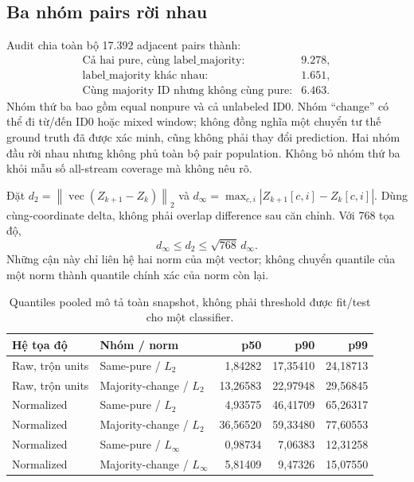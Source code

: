 \documentclass[11pt,a4paper]{article}
\newcommand{\norm}[1]{\left\lVert#1\right\rVert}
\theoremstyle{definition}
\begin{document}
\subsection{Ba nhóm pairs rời nhau}
Audit chia toàn bộ 17.392 adjacent pairs thành:
\begin{equation*}
\begin{array}{lr}
\text{Cả hai pure, cùng label\_majority:}&9.278,\\
\text{label\_majority khác nhau:}&1.651,\\
\text{Cùng majority ID nhưng không cùng pure:}&6.463.
\end{array}
\end{equation*}
Nhóm thứ ba bao gồm equal nonpure và cả unlabeled ID0. Nhóm ``change'' có
thể đi từ/đến ID0 hoặc mixed window; không đồng nghĩa một chuyển tư thế
ground truth đã được xác minh, cũng không phải thay đổi prediction. Hai
nhóm đầu rời nhau nhưng không phủ toàn bộ pair population. Không bỏ nhóm
thứ ba khỏi mẫu số all-stream coverage mà không nêu rõ.

Đặt $d_2=\norm{\operatorname{vec}(Z_{k+1}-Z_k)}_2$ và
$d_\infty=\max_{c,i}|Z_{k+1}[c,i]-Z_k[c,i]|$. Dùng cùng-coordinate delta,
không phải overlap difference sau căn chỉnh. Với 768 tọa độ,
\begin{equation}
d_\infty\le d_2\le\sqrt{768}\,d_\infty.
\end{equation}
Những cận này chỉ liên hệ hai norm của một vector; không chuyển quantile
của một norm thành quantile chính xác của norm còn lại.

\begin{table}[htbp]\centering\small
\begin{tabular}{@{}llrrr@{}}\toprule
Hệ tọa độ & Nhóm / norm & p50 & p90 & p99\\\midrule
Raw, trộn units & Same-pure / $L_2$ & 1,84282 & 17,35410 & 24,18713\\
Raw, trộn units & Majority-change / $L_2$ & 13,26583 & 22,97948 & 29,56845\\
Normalized & Same-pure / $L_2$ & 4,93575 & 46,41709 & 65,26317\\
Normalized & Majority-change / $L_2$ & 36,56520 & 59,33480 & 77,60553\\
Normalized & Same-pure / $L_\infty$ & 0,98734 & 7,06383 & 12,31258\\
Normalized & Majority-change / $L_\infty$ & 5,81409 & 9,47326 & 15,07550\\\bottomrule
\end{tabular}
\caption{Quantiles pooled mô tả toàn snapshot, không phải threshold được fit/test cho một classifier.}
\end{table}
\end{document}
